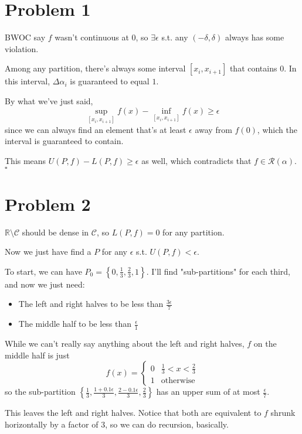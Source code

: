 \documentclass[12pt]{article}
\newcommand{\R}{\mathbb{R}}
\begin{document}
\section{Problem 1}

BWOC say $f$ wasn't continuous at $0$,
so $\exists \epsilon$ s.t. any $(-\delta, \delta)$ always has some violation.

Among any partition, there's always some interval $[x_i, x_{i+1}]$ that contains $0$.
In this interval, $\Delta \alpha_i$ is guaranteed to equal $1$.

By what we've just said,
\[\sup_{[x_i, x_{i+1}]} f(x)-\inf_{[x_i, x_{i+1}]} f(x) \ge \epsilon\]
since we can always find an element that's at least $\epsilon$ away from $f(0)$,
which the interval is guaranteed to contain.

This means $U(P, f) - L(P, f) \ge \epsilon$ as well, which contradicts that $f \in \mathcal{R}(\alpha)$. $\square$

\section{Problem 2}

$\R \setminus \mathcal{C}$ should be dense in $\mathcal{C}$, so $L(P, f)=0$ for any partition.

Now we just have find a $P$ for any $\epsilon$ s.t. $U(P, f) < \epsilon$.

To start, we can have $P_0=\left\{0, \frac{1}{3}, \frac{2}{3}, 1\right\}$.
I'll find "sub-partitions" for each third, and now we just need:
\begin{itemize}
  \item The left and right halves to be less than $\frac{3\epsilon}{7}$
  \item The middle half to be less than $\frac{\epsilon}{1}$
\end{itemize}

While we can't really say anything about the left and right halves, $f$ on the middle half is just
\[f(x)=\begin{cases}
    0 & \frac{1}{3} < x < \frac{2}{3} \\
    1 & \text{otherwise}
  \end{cases}\]
so the sub-partition $\left\{\frac{1}{3}, \frac{1+0.1\epsilon}{3}, \frac{2-0.1\epsilon}{3}, \frac{2}{3}\right\}$
has an upper sum of at most $\frac{\epsilon}{7}$.

This leaves the left and right halves.
Notice that both are equivalent to $f$ shrunk horizontally by a factor of $3$, so we can do recursion, basically.
\end{document}
